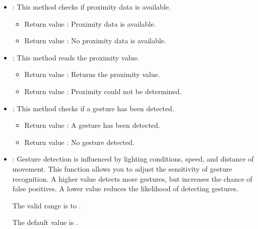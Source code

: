 \begin{itemize}
	The variables , , and  will contain the updated color values, while  will contain the ambient light intensity. The value range is $0, 1, 2, \ldots, 255$.
	
	\item {}: This method checks if proximity data is available.
	
	\medskip
	
	\begin{itemize}
		\item Return value : Proximity data is available.
		\item Return value : No proximity data is available.
	\end{itemize}
	
	\item {}: This method reads the proximity value.
	
	\medskip
	
	\begin{itemize}
		\item Return value : Returns the proximity value.
		\item Return value : Proximity could not be determined.
	\end{itemize}
	
	\item {}: This method checks if a gesture has been detected.
	
	\medskip
	
	\begin{itemize}
		\item Return value : A gesture has been detected.
		\item Return value : No gesture detected.
	\end{itemize}
	
	\item {}: Gesture detection is influenced by lighting conditions, speed, and distance of movement. This function allows you to adjust the sensitivity of gesture recognition. A higher value detects more gestures, but increases the chance of false positives. A lower value reduces the likelihood of detecting gestures.
	
	The valid range is  to .
	
	The default value is .
	

\end{itemize}
